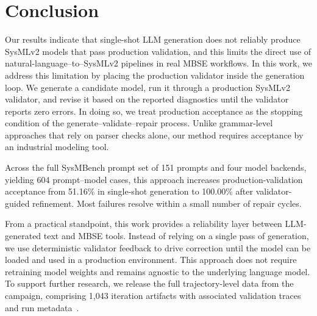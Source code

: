 \documentclass[colorlinks,upint,subscriptcorrection,varvw,hyphenate,balance]{asmeconf} %
\begin{document}


\section{Conclusion}

Our results indicate that single-shot LLM generation does not reliably produce SysMLv2 models that pass production validation, and this limits the direct use of natural-language--to--SysMLv2 pipelines in real MBSE workflows. In this work, we address this limitation by placing the production validator inside the generation loop. We generate a candidate model, run it through a production SysMLv2 validator, and revise it based on the reported diagnostics until the validator reports zero errors. In doing so, we treat production acceptance as the stopping condition of the generate--validate--repair process. Unlike grammar-level approaches that rely on parser checks alone, our method requires acceptance by an industrial modeling tool.

Across the full SysMBench prompt set of 151 prompts and four model backends, yielding 604 prompt--model cases, this approach increases production-validation acceptance from 51.16\% in single-shot generation to 100.00\% after validator-guided refinement. Most failures resolve within a small number of repair cycles.

From a practical standpoint, this work provides a reliability layer between LLM-generated text and MBSE tools. Instead of relying on a single pass of generation, we use deterministic validator feedback to drive correction until the model can be loaded and used in a production environment. This approach does not require retraining model weights and remains agnostic to the underlying language model. To support further research, we release the full trajectory-level data from the campaign, comprising 1,043 iteration artifacts with associated validation traces and run metadata~\cite{sysmbenchCompilerLoopRepo2026}.
\end{document}
